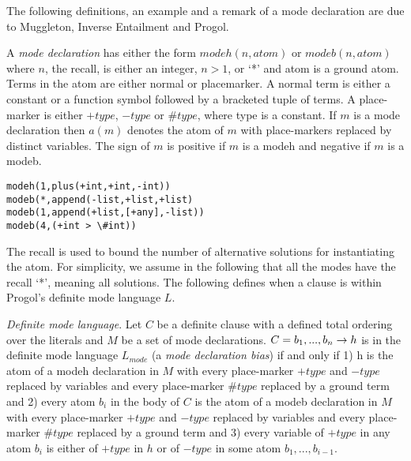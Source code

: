 The following definitions, an example and a remark of a mode declaration are due to Muggleton, Inverse Entailment and Progol\cite{muggleton1995}.
\begin{defn}\cite{muggleton1995}
A \emph{mode declaration} has either the form
$modeh(n,atom)$ or $modeb(n,atom)$ where $n$, the recall, is either an integer, $n > 1$,
or `*' and atom is a ground atom. Terms in the atom are either normal or placemarker. A normal term is either a constant or a function symbol followed by a
bracketed tuple of terms. A place-marker is either $+type$, $-type$ or $\#type$, where
type is a constant. If $m$ is a mode declaration then $a(m)$ denotes the atom of $m$
with place-markers replaced by distinct variables. The sign of $m$ is positive if $m$ is a modeh and negative if $m$ is a modeb.
\end{defn}

\begin{exmp}
\cite{muggleton1995}
\begin{lstlisting}
modeh(1,plus(+int,+int,-int))
modeb(*,append(-list,+list,+list)
modeb(1,append(+list,[+any],-list))
modeb(4,(+int > \#int))
\end{lstlisting}
\end{exmp}

\begin{remark}
\cite{muggleton1995}
The recall is used to bound the number of alternative solutions for instantiating
the atom. For simplicity, we assume in the following that all the modes have the
recall `*', meaning all solutions. The following defines when a clause is within
Progol's definite mode language $L$.
\end{remark}

\begin{defn}
\cite{muggleton1995}
\emph{Definite mode language}. Let $C$ be a definite clause with a
defined total ordering over the literals and $M$ be a set of mode declarations. $C = b_1, ..., b_n \to h$ is in the definite mode language $L_{mode}$ (a \emph{mode declaration bias}) if and only if
1) h is the atom
of a modeh declaration in $M$ with every place-marker $+type$ and $-type$ replaced by
variables and every place-marker $\#type$ replaced by a ground term and 2) every
atom $b_i$ in the body of $C$ is the atom of a modeb declaration in $M$ with every
place-marker $+type$ and $-type$ replaced by variables and every place-marker $\#type$
replaced by a ground term and 3) every variable of $+type$ in any atom $b_i$ is either
of $+type$ in $h$ or of $-type$ in some atom $b_1, ..., b_{i-1}$.
\end{defn}


